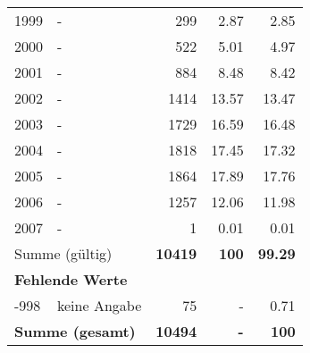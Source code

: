 \begin{longtable}{lXrrr}
        1999 & \multicolumn{1}{X}{-} & %
          \num{299} &
          \num[round-mode=places,round-precision=2]{2.87} &
          \num[round-mode=places,round-precision=2]{2.85} \\

        2000 & \multicolumn{1}{X}{-} & %
          \num{522} &
          \num[round-mode=places,round-precision=2]{5.01} &
          \num[round-mode=places,round-precision=2]{4.97} \\

        2001 & \multicolumn{1}{X}{-} & %
          \num{884} &
          \num[round-mode=places,round-precision=2]{8.48} &
          \num[round-mode=places,round-precision=2]{8.42} \\

        2002 & \multicolumn{1}{X}{-} & %
          \num{1414} &
          \num[round-mode=places,round-precision=2]{13.57} &
          \num[round-mode=places,round-precision=2]{13.47} \\

        2003 & \multicolumn{1}{X}{-} & %
          \num{1729} &
          \num[round-mode=places,round-precision=2]{16.59} &
          \num[round-mode=places,round-precision=2]{16.48} \\

        2004 & \multicolumn{1}{X}{-} & %
          \num{1818} &
          \num[round-mode=places,round-precision=2]{17.45} &
          \num[round-mode=places,round-precision=2]{17.32} \\

        2005 & \multicolumn{1}{X}{-} & %
          \num{1864} &
          \num[round-mode=places,round-precision=2]{17.89} &
          \num[round-mode=places,round-precision=2]{17.76} \\

        2006 & \multicolumn{1}{X}{-} & %
          \num{1257} &
          \num[round-mode=places,round-precision=2]{12.06} &
          \num[round-mode=places,round-precision=2]{11.98} \\

        2007 & \multicolumn{1}{X}{-} & %
          \num{1} &
          \num[round-mode=places,round-precision=2]{0.01} &
          \num[round-mode=places,round-precision=2]{0.01} \\

     \midrule
     \multicolumn{2}{l}{Summe (gültig)} &
       \textbf{\num{10419}} &
     \textbf{\num{100}} &
       \textbf{\num[round-mode=places,round-precision=2]{99.29}} \\
     \multicolumn{5}{l}{\textbf{Fehlende Werte}}\\
       -998 &
       keine Angabe &
         \num{75} &
        - &
         \num[round-mode=places,round-precision=2]{0.71} \\
     \midrule
     \multicolumn{2}{l}{\textbf{Summe (gesamt)}} &
          \textbf{\num{10494}} &
        \textbf{-} &
        \textbf{\num{100}} \\
     \bottomrule
     \end{longtable}
     
